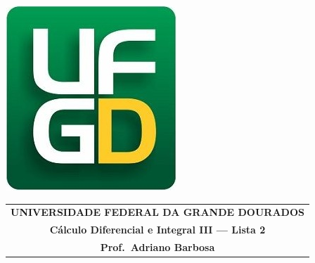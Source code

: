 \documentclass[a4paper,5pt]{amsbook}
\begin{document}
\thispagestyle{empty}
\pagestyle{empty}
\begin{minipage}[h]{0.14\textwidth}
	\includegraphics[scale=0.24]{../../ufgd.png}
\end{minipage}
\begin{minipage}[h]{\textwidth}
\begin{tabular}{c}
{{\bf UNIVERSIDADE FEDERAL DA GRANDE DOURADOS}}\\
{{\bf C\'alculo Diferencial e Integral III --- Lista 2}}\\
{{\bf Prof.\ Adriano Barbosa}}\\
\end{tabular}
\vspace{-0.45cm}
%
\end{minipage}

\end{document}
